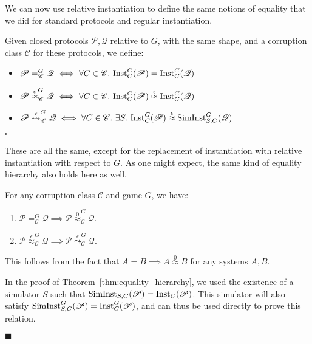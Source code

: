 We can now use relative instantiation to define the same notions
of equality that we did for standard protocols and regular instantiation.

\begin{definition}
  Given closed protocols $\mathscr{P}, \mathscr{Q}$ relative to $G$,
  with the same shape, and a corruption class $\mathscr{C}$
  for these protocols, we define:
  \begin{itemize}
    \item $\mathscr{P} =^G_{\mathscr{C}} \mathscr{Q} \iff \forall C \in \mathscr{C}.\ \text{Inst}^G_C(\mathscr{P}) = \text{Inst}^G_C(\mathscr{Q})$
    \item $\mathscr{P} \overset{\epsilon}{\approx}^G_{\mathscr{C}} \mathscr{Q}\iff \forall C \in \mathscr{C}.\ \text{Inst}^G_C(\mathscr{P}) \overset{\epsilon}{\approx} \text{Inst}^G_C(\mathscr{Q})$
    \item $\mathscr{P} \overset{\epsilon}{\leadsto}^G_{\mathscr{C}} \mathscr{Q}\iff \forall C \in \mathscr{C}.\ \exists S.\ \text{Inst}^G_C(\mathscr{P}) \overset{\epsilon}{\approx} \text{SimInst}^G_{S,C}(\mathscr{Q})$
  \end{itemize}

  $\square$
\end{definition}

These are all the same, except for the replacement of instantiation
with relative instantiation with respect to $G$.
As one might expect, the same kind of equality hierarchy also holds
here as well.

\begin{theorem}
  For any corruption class $\mathscr{C}$ and game $G$, we have:
\begin{enumerate}
\item $\mathscr{P} =^G_{\mathscr{C}} \mathscr{Q} \implies \mathscr{P} \overset{0}{\approx}^G_\mathscr{C} \mathscr{Q}$.
\item $\mathscr{P} \overset{\epsilon}{\approx}^G_{\mathscr{C}} \mathscr{Q} \implies \mathscr{P} \overset{\epsilon}{\leadsto}^G_\mathscr{C} \mathscr{Q}$.
\end{enumerate}

 This follows from the fact that $A = B \implies A \overset{0}{\approx} B$
for any systems $A, B$.

 In the proof of Theorem~\ref{thm:equality_hierarchy},
we used the existence of a simulator $S$ such that $\text{SimInst}_{S, C}(\mathscr{P}) = \text{Inst}_C(\mathscr{P})$.
This simulator will also satisfy $\text{SimInst}^G_{S, C}(\mathscr{P}) = \text{Inst}^G_C(\mathscr{P})$,
and can thus be used directly to prove this relation.

$\blacksquare$
\end{theorem}

